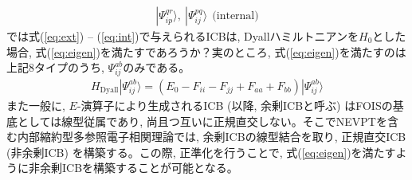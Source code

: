 \documentclass[11pt,pra,aps]{revtex4}
\begin{document}
\begin{align}
  |\Psi_{ip}^{qr}\rangle,\ |\Psi_{ij}^{pq}\rangle \ \ \text{(internal)} \label{eq:int}
\end{align}
では式(\ref{eq:ext}) -- (\ref{eq:int})で与えられるICBは, Dyallハミルトニアンを$H_0$とした場合, 式(\ref{eq:eigen})を満たすであろうか？実のところ, 式(\ref{eq:eigen})を満たすのは上記8タイプのうち, $\Psi_{ij}^{ab}$のみである。
\begin{align}
  H_\text{Dyall}|\Psi_{ij}^{ab}\rangle=\left(E_0-F_{ii}-F_{jj}+F_{aa}+F_{bb}\right)|\Psi_{ij}^{ab}\rangle
\end{align}
また一般に, $E$-演算子により生成されるICB (以降, 余剰ICBと呼ぶ) はFOISの基底としては線型従属であり, 尚且つ互いに正規直交しない。そこでNEVPTを含む内部縮約型多参照電子相関理論では, 余剰ICBの線型結合を取り, 正規直交ICB (非余剰ICB) を構築する。この際, 正準化を行うことで, 式(\ref{eq:eigen})を満たすように非余剰ICBを構築することが可能となる。
\end{document}
